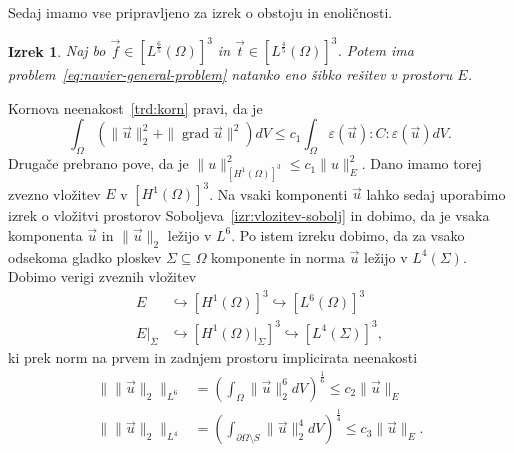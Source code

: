\documentclass[a4paper,twoside]{article}
\theoremstyle{definition} %
\theoremstyle{plain} %
\newtheorem{izrek}[definicija]{Izrek}
\numberwithin{equation}{section}
\newcommand{\grad}{\operatorname{grad}}
\newcommand{\eps}{\varepsilon}
\newcommand{\vt}{\vec{t}}
\newcommand{\vu}{\vec{u}}
\newcommand{\vf}{\vec{f}}
\begin{document}
Sedaj imamo vse pripravljeno za izrek o obstoju in enoličnosti.
\begin{izrek}
  \label{iz:enol-obst}
  Naj bo $\vf \in [L^\frac65(\Omega)]^3$ in $\vt \in [L^{\frac45}(\Omega)]^3$.
  Potem ima problem~\ref{eq:navier-general-problem} natanko eno šibko rešitev v
  prostoru $E$.
\end{izrek}
\proof
Kornova neenakost~\ref{trd:korn} pravi, da je
\[
  \int_{\Omega} (\|\vu\|_2^2 + \|\grad \vu\|^2) dV \leq c_1 \int_{\Omega}
  \eps(\vu):C:\eps(\vu)dV.
\]
Drugače prebrano pove, da je $\|u\|_{[H^1(\Omega)]^3}^2 \leq c_1 \|u\|_E^2$.
Dano imamo torej zvezno vložitev $E$ v $[H^1(\Omega)]^3$.
Na vsaki komponenti $\vu$ lahko sedaj uporabimo izrek o vložitvi prostorov
Soboljeva~\ref{izr:vlozitev-sobolj} in dobimo, da je vsaka komponenta $\vu$ in
$\|\vu\|_2$ ležijo v $L^6$. Po istem izreku dobimo, da za vsako odsekoma gladko
ploskev $\Sigma \subseteq \Omega$ komponente in norma $\vu$ ležijo v
$L^4(\Sigma)$. Dobimo verigi zveznih vložitev
\begin{align*}
  E &\hookrightarrow [H^1(\Omega)]^3 \hookrightarrow [L^6(\Omega)]^3 \\
  E|_\Sigma &\hookrightarrow [H^1(\Omega)|_\Sigma]^3 \hookrightarrow [L^4(\Sigma)]^3,
\end{align*}
ki prek norm na prvem in zadnjem prostoru implicirata neenakosti
\begin{align*}
  \|\|\vu\|_2\|_{L^6} &= \left( \int_{\Omega} \|\vu\|_2^6 dV \right)^\frac16 \leq
  c_2 \|\vu\|_E \\
  \|\|\vu\|_2\|_{L^4} &= \left( \int_{\partial\Omega\setminus S} \|\vu\|_2^4 dV \right)^\frac14 \leq
  c_3 \|\vu\|_E.
\end{align*}
\end{document}
